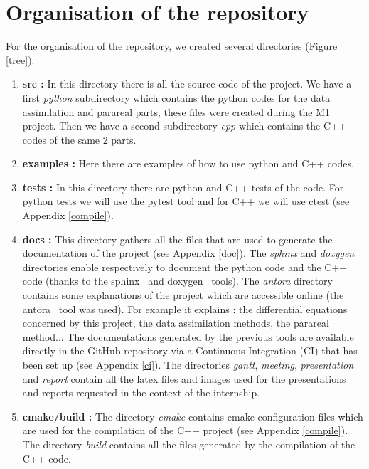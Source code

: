 \lstset{style=bash}

\section{Organisation of the repository}

	\begin{minipage}{0.65\linewidth}
		For the organisation of the repository, we created several directories (Figure \ref{tree}):
		\begin{enumerate}[label=\textbullet]
			\item \textbf{src :} In this directory there is all the source code of the project. We have a first \textit{python} subdirectory which contains the python codes for the data assimilation and parareal parts, these files were created during the M1 project. Then we have a second subdirectory \textit{cpp} which contains the C++ codes of the same 2 parts.
			\item \textbf{examples :} Here there are examples of how to use python and C++ codes.
			\item \textbf{tests :} In this directory there are python and C++ tests of the code. For python tests we will use the pytest tool and for C++ we will use ctest (see Appendix \ref{compile}).
			\item \textbf{docs :} This directory gathers all the files that are used to generate the documentation of the project (see Appendix \ref{doc}). The \textit{sphinx} and \textit{doxygen} directories enable respectively to document the python code and the C++ code (thanks to the sphinx~\cite{sphinx_doc} and doxygen~\cite{doxygen_doc} tools). The \textit{antora} directory contains some explanations of the project which are accessible online (the antora~\cite{antora_doc} tool was used). For example it explains : the differential equations concerned by this project, the data assimilation methods, the parareal method... The documentations generated by the previous tools are available directly in the GitHub repository via a Continuous Integration (CI) that has been set up (see Appendix \ref{ci}).
			The directories \textit{gantt}, \textit{meeting}, \textit{presentation} and \textit{report} contain all the latex files and images used for the presentations and reports requested in the context of the internship.
			\item \textbf{cmake/build :} The directory \textit{cmake} contains cmake configuration files which are used for the compilation of the C++ project (see Appendix \ref{compile}). The directory \textit{build} contains all the files generated by the compilation of the C++ code.
		\end{enumerate}
	\end{minipage} \qquad
